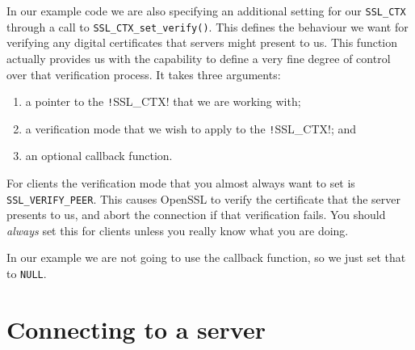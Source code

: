 In our example code we are also specifying an additional setting for our
\verb!SSL_CTX! through a call to \verb!SSL_CTX_set_verify()!. This defines the 
behaviour we want for verifying any digital certificates that servers might
present to us. This function actually provides us with the capability to define 
a very fine degree of control over that verification process. It takes three 
arguments:
\begin{enumerate}
\item a pointer to the \texttt!SSL\_CTX! that we are working with;
\item a verification mode that we wish to apply to the \texttt!SSL\_CTX!; and
\item an optional callback function.
\end{enumerate}

For clients the verification mode that you almost always want to set is 
\verb!SSL_VERIFY_PEER!. This causes OpenSSL to verify the certificate that the 
server presents to us, and abort the connection if that verification fails. You
should \emph{always} set this for clients unless you really know what you are 
doing.

In our example we are not going to use the callback function, so we just set 
that to \verb!NULL!.

\section {Connecting to a server}

